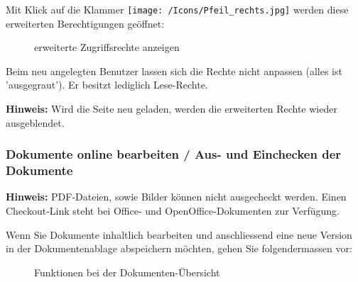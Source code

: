 Mit Klick auf die Klammer \texttt{[image: /Icons/Pfeil\_rechts.jpg]}  werden diese erweiterten Berechtigungen geöffnet:

\begin{figure}[H]
\caption{erweiterte Zugriffsrechte anzeigen}
\end{figure}

Beim neu angelegten Benutzer lassen sich die Rechte nicht anpassen  (alles ist 'ausgegraut'). Er besitzt lediglich Lese-Rechte.

\vspace{\baselineskip}

\textbf{Hinweis:} Wird die Seite neu geladen, werden die erweiterten Rechte wieder ausgeblendet.

\subsubsection{Dokumente online bearbeiten / Aus- und Einchecken der Dokumente}
\label{bkm:Ref442780171}\label{bkm:Ref442776572}

\textbf{Hinweis:} PDF-Dateien, sowie Bilder können nicht ausgecheckt werden. Einen Checkout-Link steht bei Office- und OpenOffice-Dokumenten zur Verfügung.

\vspace{\baselineskip}

Wenn Sie Dokumente inhaltlich bearbeiten und anschliessend eine neue Version in der Dokumentenablage abspeichern möchten, gehen Sie folgendermassen vor:

\begin{figure}[H]
\caption{Funktionen bei der Dokumenten-Übersicht}
\end{figure}

